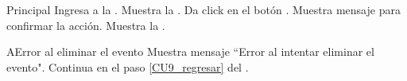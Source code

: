     \begin{UCtrayectoria}{Principal}
    \UCpaso[\UCactor] Ingresa a la .
    \UCpaso Muestra la .
    \UCpaso[\UCactor] Da click en el botón . \label{CU9_regresar} 
    \UCpaso Muestra mensaje para confirmar la acción. 
    \UCpaso Muestra la .
    \end{UCtrayectoria}
    
    \begin{UCtrayectoriaA}{A}{Error al eliminar el evento}
    	\UCpaso Muestra mensaje “Error al intentar eliminar el evento".
    	\UCpaso Continua en el paso \ref{CU9_regresar} del .
    \end{UCtrayectoriaA}

	


